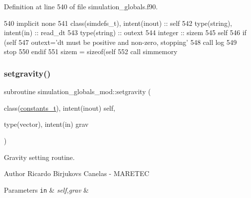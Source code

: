 Definition at line 540 of file simulation\+\_\+globals.\+f90.


\begin{DoxyCode}
540     \textcolor{keywordtype}{implicit none}
541     \textcolor{keywordtype}{class}(simdefs\_t), \textcolor{keywordtype}{intent(inout)} :: self
542     \textcolor{keywordtype}{type}(string), \textcolor{keywordtype}{intent(in)} :: read\_dt
543     \textcolor{keywordtype}{type}(string) :: outext
544     \textcolor{keywordtype}{integer} :: sizem
545     self%
546     \textcolor{keywordflow}{if} (self%
547         outext=\textcolor{stringliteral}{'dt must be positive and non-zero, stopping'}
548         \textcolor{keyword}{call }log%
549         stop
550 \textcolor{keywordflow}{    endif}
551     sizem = sizeof(self%
552     \textcolor{keyword}{call }simmemory%
\end{DoxyCode}
\mbox{\label{namespacesimulation__globals__mod_a9e92dfed4ef7388208adce768f064554}} 
\subsubsection{\texorpdfstring{setgravity()}{setgravity()}}
{\footnotesize\ttfamily subroutine simulation\+\_\+globals\+\_\+mod\+::setgravity (\begin{DoxyParamCaption}\item[{class(\mbox{\hyperlink{structsimulation__globals__mod_1_1constants__t}{constants\+\_\+t}}), intent(inout)}]{self,  }\item[{type(vector), intent(in)}]{grav }\end{DoxyParamCaption})\hspace{0.3cm}{\ttfamily [private]}}



Gravity setting routine. 

\begin{DoxyAuthor}{Author}
Ricardo Birjukovs Canelas -\/ M\+A\+R\+E\+T\+EC 
\end{DoxyAuthor}

\begin{DoxyParams}[1]{Parameters}
\mbox{\tt in}  & {\em self,grav} & \\
\hline
\end{DoxyParams}


